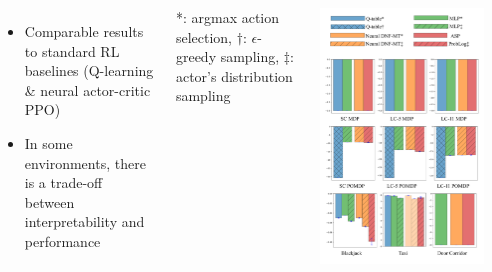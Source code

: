 \documentclass{tikzposter} %
\begin{document}
\begin{columns}
{\begin{center}
        \end{center}

    }

     {

        \begin{itemize}
            \item Comparable results to standard RL baselines (Q-learning \&
                  neural actor-critic PPO)
            \item In some environments, there is a trade-off between
                  interpretability and performance
        \end{itemize}

        \vspace{1em}

        *: argmax action selection, $\dagger$: $\epsilon$-greedy sampling,
        $\ddagger$: actor's distribution sampling

        \vspace{-1em}

        \begin{center}
            \includegraphics[width=\colwidth]{img/rl-performance}
        \end{center}

}
\end{columns}
\end{document}
